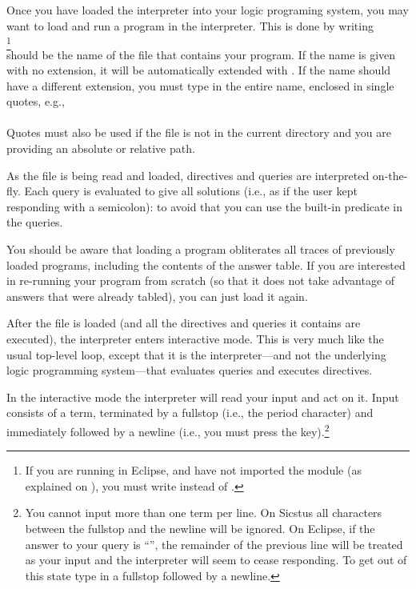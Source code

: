 Once you have loaded the interpreter into your logic programing system, you
may want to load and run a program in the interpreter. This is done by
writing\\
\ind{}%
\footnote{
  If you are running in Eclipse, and have not imported the module 
  (as explained on ), you must write 
  instead of .
}\\
 should be the name of the file that contains your program.
If the name is given with no extension, it will be automatically extended
with .%
%
If the name should have a different extension, you must type in the entire
name, enclosed in single quotes, e.g.,\\
\ind{}\\
Quotes must also be used if the file is not in the current directory and you
are providing an absolute or relative path.

As the file is being read and loaded, directives and queries are interpreted
on-the-fly. Each query is evaluated to give all solutions (i.e., as if the
user kept responding with a semicolon): to avoid that you can use the
built-in predicate  in the queries.

You should be aware that loading a program obliterates all traces of
previously loaded programs, including the contents of the answer table.  If
you are interested in re-running your program from scratch (so that it does
not take advantage of answers that were already tabled), you can just load it
again.

\vfill %



%

After the file is loaded (and all the directives and queries it contains are
executed), the interpreter enters interactive mode.  This is very much like
the usual top-level loop, except that it is the interpreter---and not the
underlying logic programming system---that evaluates queries and executes
directives.

In the interactive mode the interpreter will read your input and act on it.
Input consists of a term, terminated by a fullstop (i.e., the period
character) and immediately followed by a newline (i.e., you must press the
 key).\footnote{
  You cannot input more than one term per line. On Sicstus all characters
  between the fullstop and the newline will be ignored.  On Eclipse, if the
  answer to your query is ``'', the remainder of the
  previous line will be treated as your input and the interpreter will seem
  to cease responding.  To get out of this state type in a fullstop followed
  by a newline.}

